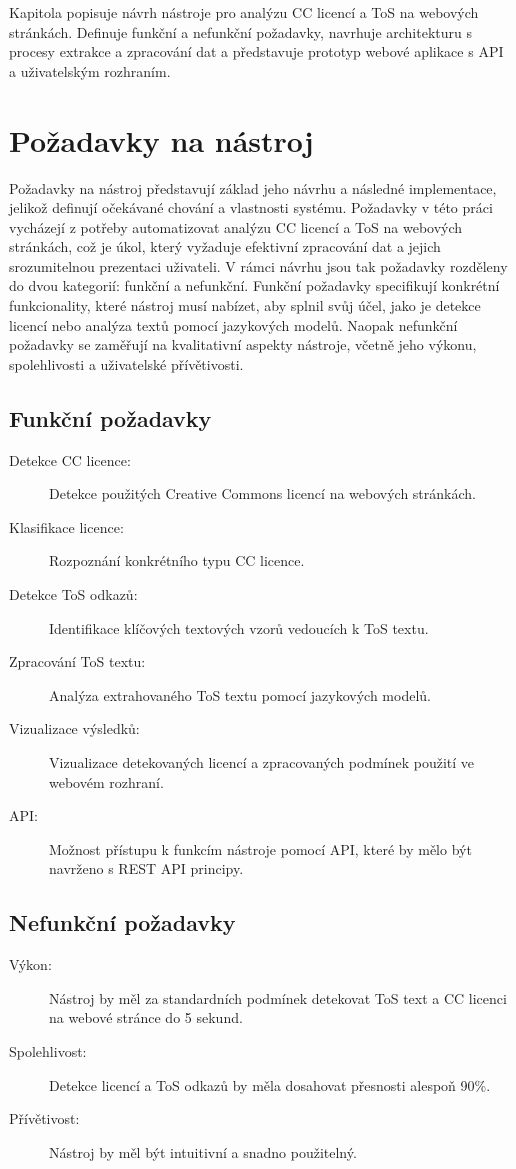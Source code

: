 \begin{chapterabstract}
    Kapitola popisuje návrh nástroje pro analýzu CC licencí a ToS na webových stránkách.
    Definuje funkční a nefunkční požadavky, navrhuje architekturu s procesy extrakce a zpracování dat a představuje prototyp webové aplikace s API a uživatelským rozhraním.
\end{chapterabstract}

\section{Požadavky na nástroj}
Požadavky na nástroj představují základ jeho návrhu a následné implementace, jelikož definují očekávané chování a vlastnosti systému.
Požadavky v této práci vycházejí z potřeby automatizovat analýzu CC licencí a ToS na webových stránkách, což je úkol, který vyžaduje efektivní zpracování dat a jejich srozumitelnou prezentaci uživateli.
V rámci návrhu jsou tak požadavky rozděleny do dvou kategorií: funkční a nefunkční.
Funkční požadavky specifikují konkrétní funkcionality, které nástroj musí nabízet, aby splnil svůj účel, jako je detekce licencí nebo analýza textů pomocí jazykových modelů.
Naopak nefunkční požadavky se zaměřují na kvalitativní aspekty nástroje, včetně jeho výkonu, spolehlivosti a uživatelské přívětivosti.

\subsection{Funkční požadavky}
\label{chap:functional}
\begin{description}
    \item[Detekce CC licence:] Detekce použitých Creative Commons licencí na webových stránkách.
    \item[Klasifikace licence:] Rozpoznání konkrétního typu CC licence.
    \item[Detekce ToS odkazů:] Identifikace klíčových textových vzorů vedoucích k ToS textu.
    \item[Zpracování ToS textu:] Analýza extrahovaného ToS textu pomocí jazykových modelů.
    \item[Vizualizace výsledků:] Vizualizace detekovaných licencí a zpracovaných podmínek použití ve webovém rozhraní.
    \item[API:] Možnost přístupu k funkcím nástroje pomocí API, které by mělo být navrženo s REST API principy.
\end{description}

\subsection{Nefunkční požadavky}
\label{chap:nonfunctional}
\begin{description}
    \item[Výkon:] Nástroj by měl za standardních podmínek detekovat ToS text a CC licenci na webové stránce do 5 sekund.
    \item[Spolehlivost:] Detekce licencí a ToS odkazů by měla dosahovat přesnosti alespoň 90\%.
    \item[Přívětivost:] Nástroj by měl být intuitivní a snadno použitelný.
\end{description}

